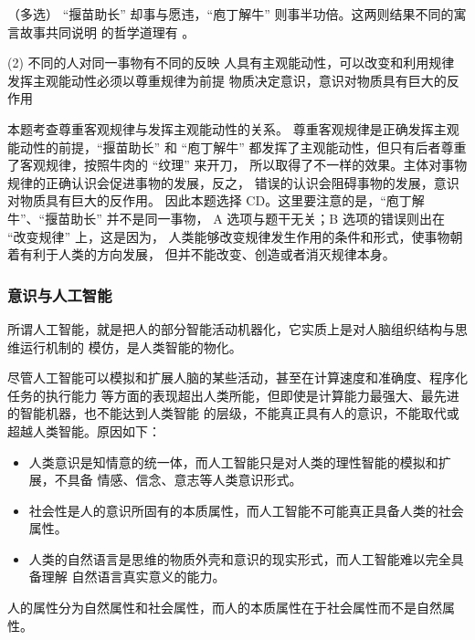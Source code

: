 \documentclass[10pt, UTF8]{book} %
\begin{document}
\begin{example}
    （多选）
    “揠苗助长” 却事与愿违，“庖丁解牛” 则事半功倍。这两则结果不同的寓言故事共同说明
    的哲学道理有 \underline{\qquad \qquad \qquad}。
    \begin{tasks}[label={\Alph*.}](2)
        \task 不同的人对同一事物有不同的反映
        \task 人具有主观能动性，可以改变和利用规律
        \task 发挥主观能动性必须以尊重规律为前提
        \task 物质决定意识，意识对物质具有巨大的反作用
    \end{tasks}
    \begin{cmt}
        本题考查尊重客观规律与发挥主观能动性的关系。
        尊重客观规律是正确发挥主观能动性的前提，“揠苗助长” 和 “庖丁解牛”
        都发挥了主观能动性，但只有后者尊重了客观规律，按照牛肉的 “纹理” 来开刀，
        所以取得了不一样的效果。主体对事物规律的正确认识会促进事物的发展，反之，
        错误的认识会阻碍事物的发展，意识对物质具有巨大的反作用。
        因此本题选择 CD。这里要注意的是，“庖丁解牛”、“揠苗助长” 并不是同一事物，
        A 选项与题干无关；B 选项的错误则出在 “改变规律” 上，这是因为，
        人类能够改变规律发生作用的条件和形式，使事物朝着有利于人类的方向发展，
        但并不能改变、创造或者消灭规律本身。
    \end{cmt}
\end{example}

\subsubsection{意识与人工智能}

所谓人工智能，就是把人的部分智能活动机器化，它实质上是对人脑组织结构与思维运行机制的
模仿，是人类智能的物化。

尽管人工智能可以模拟和扩展人脑的某些活动，甚至在计算速度和准确度、程序化任务的执行能力
等方面的表现超出人类所能，但即使是计算能力最强大、最先进的智能机器，也不能达到人类智能
的层级，不能真正具有人的意识，不能取代或超越人类智能。原因如下：
\begin{itemize}[itemsep=0pt]
    \item 人类意识是知情意的统一体，而人工智能只是对人类的理性智能的模拟和扩展，不具备
    情感、信念、意志等人类意识形式。
    \item 社会性是人的意识所固有的本质属性，而人工智能不可能真正具备人类的社会属性。
    \item 人类的自然语言是思维的物质外壳和意识的现实形式，而人工智能难以完全具备理解
    自然语言真实意义的能力。
\end{itemize}
\begin{remark}
    人的属性分为自然属性和社会属性，而人的本质属性在于社会属性而不是自然属性。
\end{remark}
\end{document}
